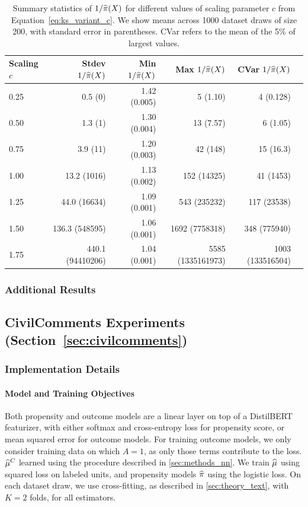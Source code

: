 \begin{table}[ht]
\centering
\footnotesize
\begin{tabular}{lrrrrr}
  \toprule
Scaling $c$ & Stdev $1/\widehat{\pi}(X)$  & Min $1/\widehat{\pi}(X)$ & Max $1/\widehat{\pi}(X)$ &  CVar $1/\widehat{\pi}(X)$  \\ 
  \midrule
0.25 & 0.5 (0) & 1.42 (0.005) & 5 (1.10) & 4 (0.128)\\ 
  0.50 & 1.3 (1)& 1.30 (0.004) & 13 (7.57) & 6 (1.05) \\ 
  0.75 & 3.9 (11)& 1.20 (0.003) & 42 (148)& 15 (16.3)\\ 
  1.00 & 13.2 (1016)& 1.13 (0.002) & 152 (14325) & 41 (1453) \\ 
  1.25 & 44.0 (16634)& 1.09 (0.001) & 543 (235232) & 117  (23538)\\ 
  1.50 & 136.3 (548595) & 1.06 (0.001) & 1692 (7758318) & 348 (775940) \\ 
  1.75 & 440.1 (94410206) & 1.04 (0.001)  & 5585 (1335161973) & 1003 (133516504) \\ 
   \bottomrule
\end{tabular}
\caption{Summary statistics of $1/\widehat{\pi}(X)$ for different values of scaling parameter $c$ from Equation~\eqref{eq:ks_variant_c}. We show means across 1000 dataset draws of size 200, with standard error in parentheses. CVar refers to the mean of the 5\% of largest values.}
\label{tb:1_prop_stats_ks}
\end{table}

\subsubsection{Additional Results}
\label{sec:ks_more_results} 



\subsection{CivilComments Experiments (Section~\ref{sec:civilcomments})}
\subsubsection{Implementation Details}
\label{sec:nlp_details}


\paragraph{Model and Training Objectives}
Both propensity and outcome models are a linear layer on top of a DistilBERT featurizer, with either softmax and cross-entropy loss for propensity score, or mean squared error for outcome models. 
For training outcome models, we only consider training data on which $A=1$, as only those terms contribute to the loss. 
\ifdefined\pnas
    $\widehat{\mu}^C$ learned using the procedure described in \cref{sec:methods_nn}. 
    We train $\widehat{\mu}$
    using squared loss on labeled units, and propensity models $\widehat{\pi}$ using the logistic loss. 
    On each dataset draw, we use cross-fitting, as described in \cref{sec:theory_text}, with $K=2$ folds, for all estimators. 
\fi
